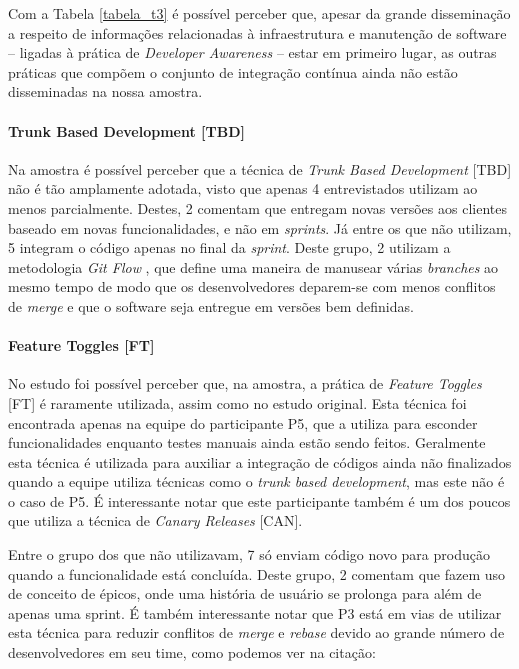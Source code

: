 Com a Tabela \ref{tabela_t3} é possível perceber que, apesar da grande disseminação a respeito de informações relacionadas à infraestrutura e manutenção de software -- ligadas à prática de \emph{Developer Awareness} \cite{awa} -- estar em primeiro lugar, as outras práticas que compõem o conjunto de integração contínua ainda não estão disseminadas na nossa amostra.

\paragraph*{Trunk Based Development [TBD]}
Na amostra é possível perceber que a técnica de \emph{Trunk Based Development} [TBD] \cite{devAndDeploymentFB} não é tão amplamente adotada, visto que apenas 4 entrevistados utilizam ao menos parcialmente. Destes, 2 comentam que entregam novas versões aos clientes baseado em novas funcionalidades, e não em \emph{sprints}. Já entre os que não utilizam, 5 integram o código apenas no final da \emph{sprint}. Deste grupo, 2 utilizam a metodologia \emph{Git Flow} \cite{gitFlow}, que define uma maneira de manusear várias \emph{branches} ao mesmo tempo de modo que os desenvolvedores deparem-se com menos conflitos de \emph{merge} e que o software seja entregue em versões bem definidas.

\paragraph*{Feature Toggles [FT]}

No estudo foi possível perceber que, na amostra, a prática de \emph{Feature Toggles} [FT] \cite{featureToggles} é raramente utilizada, assim como no estudo original. Esta técnica foi encontrada apenas na equipe do participante P5, que a utiliza para esconder funcionalidades enquanto testes manuais ainda estão sendo feitos. Geralmente esta técnica é utilizada para auxiliar a integração de códigos ainda não finalizados quando a equipe utiliza técnicas como o \emph{trunk based development}, mas este não é o caso de P5. É interessante notar que este participante também é um dos poucos que utiliza a técnica de \emph{Canary Releases} [CAN].

Entre o grupo dos que não utilizavam, 7 só enviam código novo para produção quando a funcionalidade está concluída. Deste grupo, 2 comentam que fazem uso de conceito de épicos, onde uma história de usuário se prolonga para além de apenas uma sprint. É também interessante notar que P3 está em vias de utilizar esta técnica para reduzir conflitos de \emph{merge} e \emph{rebase} devido ao grande número de desenvolvedores em seu time, como podemos ver na citação:


